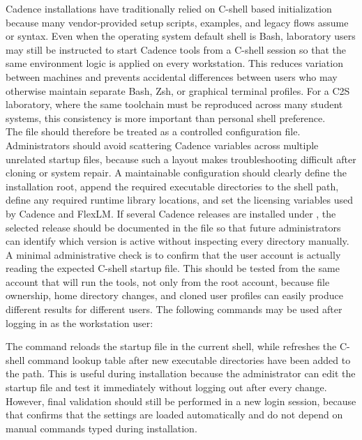 \noindent Cadence installations have traditionally relied on C-shell based initialization because many
vendor-provided setup scripts, examples, and legacy flows assume  or
 syntax. Even when the operating system default shell is Bash, laboratory users may
still be instructed to start Cadence tools from a C-shell session so that the same environment logic
is applied on every workstation. This reduces variation between machines and prevents accidental
differences between users who may otherwise maintain separate Bash, Zsh, or graphical terminal
profiles. For a C2S laboratory, where the same toolchain must be reproduced across many student
systems, this consistency is more important than personal shell preference.\\

\noindent The  file should therefore be treated as a controlled configuration file.
Administrators should avoid scattering Cadence variables across multiple unrelated startup files,
because such a layout makes troubleshooting difficult after cloning or system repair. A maintainable
configuration should clearly define the installation root, append the required executable directories
to the shell path, define any required runtime library locations, and set the licensing variables
used by Cadence and FlexLM. If several Cadence releases are installed under ,
the selected release should be documented in the file so that future administrators can identify
which version is active without inspecting every directory manually.\\

\noindent A minimal administrative check is to confirm that the user account is actually reading the
expected C-shell startup file. This should be tested from the same account that will run the tools,
not only from the root account, because file ownership, home directory changes, and cloned user
profiles can easily produce different results for different users. The following commands may be
used after logging in as the workstation user:


\noindent The  command reloads the startup file in the current shell, while
 refreshes the C-shell command lookup table after new executable directories have
been added to the path. This is useful during installation because the administrator can edit the
startup file and test it immediately without logging out after every change. However, final
validation should still be performed in a new login session, because that confirms that the settings
are loaded automatically and do not depend on manual commands typed during installation.\\


